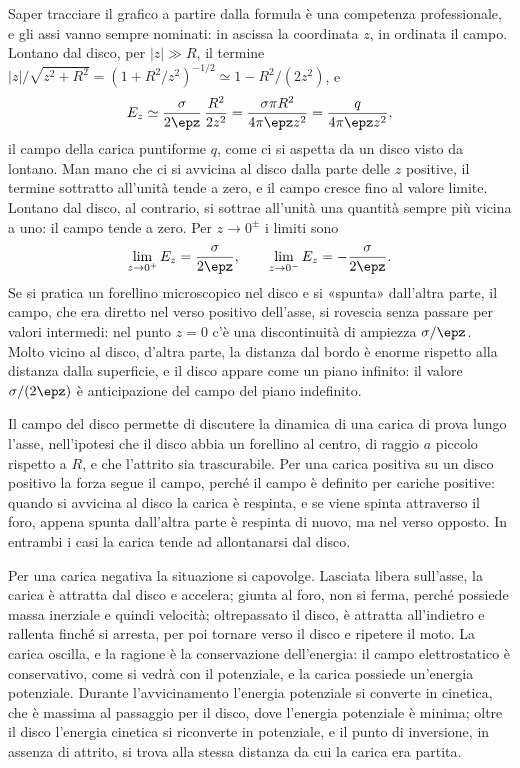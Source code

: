 \documentclass[main.tex]{subfiles}
\begin{document}
Saper tracciare il grafico a partire dalla formula è una competenza professionale, e gli assi vanno sempre nominati: in ascissa la coordinata $z$, in ordinata il campo. Lontano dal disco, per $|z|\gg R$, il termine $|z|/\sqrt{z^2+R^2}=(1+R^2/z^2)^{-1/2}\simeq1-R^2/(2z^2)$, e
\[
E_z\simeq\frac{\sigma}{2\epz}\,\frac{R^2}{2z^2}=\frac{\sigma\pi R^2}{4\pi\epz z^2}=\frac{q}{4\pi\epz z^2},
\]
il campo della carica puntiforme $q$, come ci si aspetta da un disco visto da lontano. Man mano che ci si avvicina al disco dalla parte delle $z$ positive, il termine sottratto all'unità tende a zero, e il campo cresce fino al valore limite. Lontano dal disco, al contrario, si sottrae all'unità una quantità sempre più vicina a uno: il campo tende a zero. Per $z\to0^{\pm}$ i limiti sono
\[
\lim_{z\to 0^{+}} E_z = \frac{\sigma}{2\epz}, \qquad \lim_{z\to 0^{-}} E_z = -\frac{\sigma}{2\epz} .
\]
Se si pratica un forellino microscopico nel disco e si «spunta» dall'altra parte, il campo, che era diretto nel verso positivo dell'asse, si rovescia senza passare per valori intermedi: nel punto $z=0$ c'è una discontinuità di ampiezza $\sigma/\epz$. Molto vicino al disco, d'altra parte, la distanza dal bordo è enorme rispetto alla distanza dalla superficie, e il disco appare come un piano infinito: il valore $\sigma/(2\epz)$ è anticipazione del campo del piano indefinito.

Il campo del disco permette di discutere la dinamica di una carica di prova lungo l'asse, nell'ipotesi che il disco abbia un forellino al centro, di raggio $a$ piccolo rispetto a $R$, e che l'attrito sia trascurabile. Per una carica positiva su un disco positivo la forza segue il campo, perché il campo è definito per cariche positive: quando si avvicina al disco la carica è respinta, e se viene spinta attraverso il foro, appena spunta dall'altra parte è respinta di nuovo, ma nel verso opposto. In entrambi i casi la carica tende ad allontanarsi dal disco.

Per una carica negativa la situazione si capovolge. Lasciata libera sull'asse, la carica è attratta dal disco e accelera; giunta al foro, non si ferma, perché possiede massa inerziale e quindi velocità; oltrepassato il disco, è attratta all'indietro e rallenta finché si arresta, per poi tornare verso il disco e ripetere il moto. La carica oscilla, e la ragione è la conservazione dell'energia: il campo elettrostatico è conservativo, come si vedrà con il potenziale, e la carica possiede un'energia potenziale. Durante l'avvicinamento l'energia potenziale si converte in cinetica, che è massima al passaggio per il disco, dove l'energia potenziale è minima; oltre il disco l'energia cinetica si riconverte in potenziale, e il punto di inversione, in assenza di attrito, si trova alla stessa distanza da cui la carica era partita.
\end{document}
